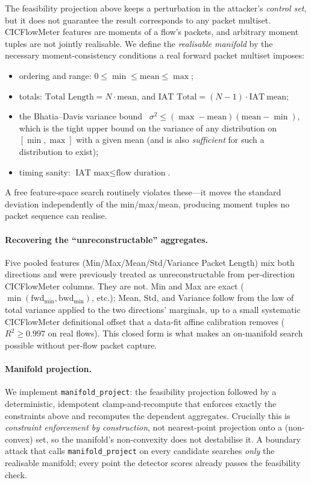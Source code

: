 \documentclass[10pt,twocolumn]{article}
\newcommand{\code}[1]{\texttt{\small #1}}
\begin{document}
The feasibility projection above keeps a perturbation in the attacker's
\emph{control set}, but it does not guarantee the result corresponds to any packet
multiset. CICFlowMeter features are moments of a flow's packets, and arbitrary
moment tuples are not jointly realisable. We define the \emph{realisable manifold}
by the necessary moment-consistency conditions a real forward packet multiset
imposes:
\begin{itemize}\itemsep1pt
  \item ordering and range: $0 \le \min \le \mathrm{mean} \le \max$;
  \item totals: $\text{Total Length} = N \cdot \mathrm{mean}$, and
  $\text{IAT Total} = (N{-}1)\cdot \mathrm{IAT\ mean}$;
  \item the Bhatia--Davis variance bound~\cite{bhatia2000variance}
  $\sigma^2 \le (\max-\mathrm{mean})(\mathrm{mean}-\min)$, which is the tight upper
  bound on the variance of any distribution on $[\min,\max]$ with a given mean
  (and is also \emph{sufficient} for such a distribution to exist);
  \item timing sanity: $\text{IAT max} \le \text{flow duration}$.
\end{itemize}
A free feature-space search routinely violates these---it moves the standard
deviation independently of the min/max/mean, producing moment tuples no packet
sequence can realise.

\paragraph{Recovering the ``unreconstructable'' aggregates.}
Five pooled features (Min/Max/Mean/Std/Variance Packet Length) mix both
directions and were previously treated as unreconstructable from per-direction
CICFlowMeter columns. They are not. Min and Max are exact
($\min(\text{fwd}_{\min},\text{bwd}_{\min})$, etc.); Mean, Std, and Variance
follow from the law of total variance applied to the two directions' marginals,
up to a small systematic CICFlowMeter definitional offset that a data-fit affine
calibration removes ($R^2 \ge 0.997$ on real flows). This closed form is what
makes an on-manifold search possible without per-flow packet capture.

\paragraph{Manifold projection.}
We implement \code{manifold\_project}: the feasibility projection followed by a
deterministic, idempotent clamp-and-recompute that enforces exactly the
constraints above and recomputes the dependent aggregates. Crucially this is
\emph{constraint enforcement by construction}, not nearest-point projection onto a
(non-convex) set, so the manifold's non-convexity does not destabilise it. A
boundary attack that calls \code{manifold\_project} on every candidate searches
\emph{only} the realisable manifold; every point the detector scores already
passes the feasibility check.
\end{document}
